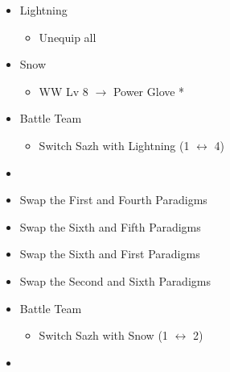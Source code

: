 \begin{paracol}{2}
\begin{menu}
\begin{itemize}
\begin{itemize}
				\item Lightning
				      \begin{itemize}
					      \item Unequip all
				      \end{itemize}
				\item Snow
				      \begin{itemize}
					      \item WW Lv 8 $\rightarrow$ Power Glove *
				      \end{itemize}
			\end{itemize}
			\paradigm
			\begin{itemize}
				\item Battle Team
				      \begin{itemize}
					      \item Switch Sazh with Lightning (1 $\leftrightarrow$ 4)
				      \end{itemize}
				\item {}%
				      {\paradigmline{\com}{\sen}{\med}}%
				      {\paradigmline{(\rav)}{\rav}{\rav}}%
				      {\paradigmline{(\rav)}{\sen}{(\rav)}}%
				      {\paradigmline[4]{\textit{(\com)}}{\textit{\com}}{\textit{(\com)}}}%
				      {\paradigmline{\rav}{\com}{(\com)}}%
				      {\paradigmline{\rav}{\com}{(\rav)}}
				\item Swap the First and Fourth Paradigms
				\item Swap the Sixth and Fifth Paradigms
				\item Swap the Sixth and First Paradigms
				\item Swap the Second and Sixth Paradigms
			\end{itemize}
		\end{itemize}
	\end{menu}
	\switchcolumn
	\begin{menu}
\begin{itemize}
    \paradigm
    \begin{itemize}
        \item Battle Team
        \begin{itemize}
            \item Switch Sazh with Snow (1 $\leftrightarrow$ 2)
        \end{itemize}
        \item {}%
{\paradigmline{(\rav)}{\com}{\com}}%
{\paradigmline[2]{\textit{\com}}{\textit{\com}}{\textit{\com}}}%

\end{itemize}
\end{itemize}
\end{menu}
\end{paracol}
